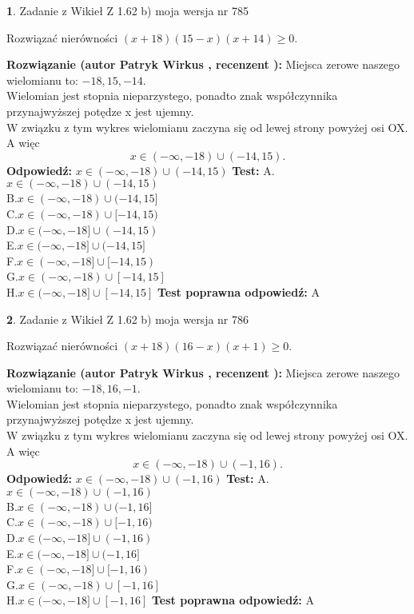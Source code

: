 \documentclass[12pt, a4paper]{article}
\theoremstyle{definition} %
\newtheorem{zad}{}
\newcommand{\zadStart}[1]{\begin{zad}#1\newline}
\newcommand{\zadStop}{\end{zad}}
\newcommand{\rozwStart}[2]{\noindent \textbf{Rozwiązanie (autor #1 , recenzent #2): }\newline}
\newcommand{\rozwStop}{\newline}
\newcommand{\odpStart}{\noindent \textbf{Odpowiedź:}\newline}
\newcommand{\odpStop}{\newline}
\newcommand{\testStart}{\noindent \textbf{Test:}\newline}
\newcommand{\testStop}{\newline}
\newcommand{\kluczStart}{\noindent \textbf{Test poprawna odpowiedź:}\newline}
\newcommand{\kluczStop}{\newline}
\begin{document}
\zadStart{Zadanie z Wikieł Z 1.62 b) moja wersja nr 785}

Rozwiązać nierówności $(x+18)(15-x)(x+14)\ge0$.
\zadStop
\rozwStart{Patryk Wirkus}{}
Miejsca zerowe naszego wielomianu to: $-18, 15, -14$.\\
Wielomian jest stopnia nieparzystego, ponadto znak współczynnika przy\linebreak najwyższej potędze x jest ujemny.\\ W związku z tym wykres wielomianu zaczyna się od lewej strony powyżej osi OX. A więc $$x \in (-\infty,-18) \cup (-14,15).$$
\rozwStop
\odpStart
$x \in (-\infty,-18) \cup (-14,15)$
\odpStop
\testStart
A.$x \in (-\infty,-18) \cup (-14,15)$\\
B.$x \in (-\infty,-18) \cup (-14,15]$\\
C.$x \in (-\infty,-18) \cup [-14,15)$\\
D.$x \in (-\infty,-18] \cup (-14,15)$\\
E.$x \in (-\infty,-18] \cup (-14,15]$\\
F.$x \in (-\infty,-18] \cup [-14,15)$\\
G.$x \in (-\infty,-18) \cup [-14,15]$\\
H.$x \in (-\infty,-18] \cup [-14,15]$
\testStop
\kluczStart
A
\kluczStop



\zadStart{Zadanie z Wikieł Z 1.62 b) moja wersja nr 786}

Rozwiązać nierówności $(x+18)(16-x)(x+1)\ge0$.
\zadStop
\rozwStart{Patryk Wirkus}{}
Miejsca zerowe naszego wielomianu to: $-18, 16, -1$.\\
Wielomian jest stopnia nieparzystego, ponadto znak współczynnika przy\linebreak najwyższej potędze x jest ujemny.\\ W związku z tym wykres wielomianu zaczyna się od lewej strony powyżej osi OX. A więc $$x \in (-\infty,-18) \cup (-1,16).$$
\rozwStop
\odpStart
$x \in (-\infty,-18) \cup (-1,16)$
\odpStop
\testStart
A.$x \in (-\infty,-18) \cup (-1,16)$\\
B.$x \in (-\infty,-18) \cup (-1,16]$\\
C.$x \in (-\infty,-18) \cup [-1,16)$\\
D.$x \in (-\infty,-18] \cup (-1,16)$\\
E.$x \in (-\infty,-18] \cup (-1,16]$\\
F.$x \in (-\infty,-18] \cup [-1,16)$\\
G.$x \in (-\infty,-18) \cup [-1,16]$\\
H.$x \in (-\infty,-18] \cup [-1,16]$
\testStop
\kluczStart
A
\kluczStop
\end{document}
